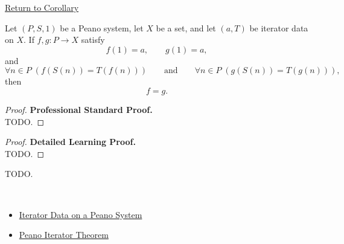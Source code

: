 \newpage
{}
\label{prf:uniqueness-of-recursively-defined-functions}

\begin{remark*}[Return]
\hyperref[cor:uniqueness-of-recursively-defined-functions]{Return to Corollary}
\end{remark*}

\begin{corollary*}
Let $(P,S,1)$ be a Peano system, let $X$ be a set, and let $(a,T)$ be iterator
data on $X$. If $f,g : P \to X$ satisfy
\[
f(1)=a,\qquad g(1)=a,
\]
and
\[
\forall n \in P\;(f(S(n))=T(f(n)))
\qquad\text{and}\qquad
\forall n \in P\;(g(S(n))=T(g(n))),
\]
then
\[
f=g.
\]
\end{corollary*}

\begin{proof}
\textbf{Professional Standard Proof.}~\\
TODO.
\end{proof}

\begin{proof}
\textbf{Detailed Learning Proof.}~\\
TODO.
\end{proof}

\begin{remark*}
TODO.
\end{remark*}

\begin{remark*}[Dependencies]~\\
\begin{itemize}
  \item \hyperref[def:iterator-data-on-peano-system]{Iterator Data on a Peano System}
  \item \hyperref[thm:peano-iterator-theorem]{Peano Iterator Theorem}
\end{itemize}
\end{remark*}
